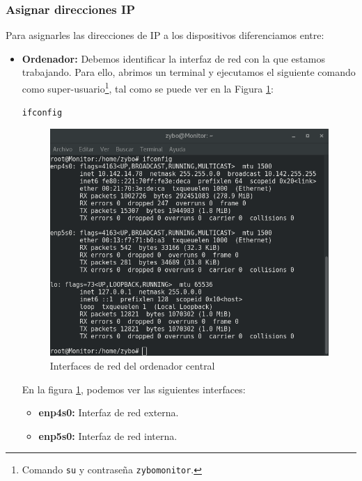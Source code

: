 \subsubsection{Asignar direcciones IP}
Para asignarles las direcciones de IP a los dispositivos diferenciamos entre:
\begin{itemize}
	\item \textbf{Ordenador:} Debemos identificar la interfaz de red con la que estamos trabajando. Para ello, abrimos un terminal y ejecutamos el siguiente comando como super-usuario\footnote{Comando \texttt{su} y contraseña \texttt{zybomonitor}.}, tal como se puede ver en la Figura \ref{Interfaces de red del ordenador central}:
	\begin{center}
		\texttt{ifconfig}
	\end{center}
	\newpage
	\begin{figure}[h]
		\centering
		\includegraphics[scale=0.5]{Anexos/Anexo2/Infraestructura/ifconfigPC.png}
		\caption{Interfaces de red del ordenador central}
		\label{Interfaces de red del ordenador central}
	\end{figure}
	
	En la figura \ref{Interfaces de red del ordenador central}, podemos ver las siguientes interfaces:
	\begin{itemize}
		\item \textbf{enp4s0:} Interfaz de red externa.
		\item \textbf{enp5s0:} Interfaz de red interna.
	\end{itemize}
	

\end{itemize}
